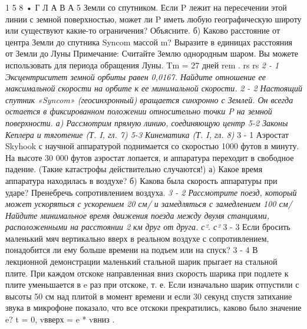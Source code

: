 \documentclass[10pt,oneside]{article}
\begin{document}
1 5 8 • Г Л А В А  5 Земли со спутником. Если P лежит на пересечении этой линии с земной поверхностью, может ли P иметь любую географическую широту или существуют какие-то ограничения? Объясните. б) Каково расстояние от центра Земли до спутника Syncom массой m? Выразите в единицах расстояния от Земли до Луны Примечание: Считайте Землю однородным шаром. Вы можете использовать для периода обращения Луны. Tm = 27 дней rem . rs rs \emph{ 2 - 1 Эксцентриситет земной орбиты равен 0,0167. Найдите отношение ее максимальной скорости на орбите к ее минимальной скорости. } \emph{ 2 - 2 Настоящий спутник «Syncom» (геосинхронный) вращается синхронно с Землей. Он всегда остается в фиксированном положении относительно точки P на земной поверхности. а) Рассмотрим прямую линию, соединяющую центр 5-2 Законы Кеплера и тяготение (Т. I, гл. 7) 5-3 Кинематика (Т. I, гл. 8) } 3 - 1 Аэростат Skyhook с научной аппаратурой поднимается со скоростью 1000 футов в минуту. На высоте 30 000 футов аэростат лопается, и аппаратура переходит в свободное падение. (Такие катастрофы действительно случаются!) а) Какое время аппаратура находилась в воздухе? б) Какова была скорость аппаратуры при ударе? Пренебречь сопротивлением воздуха. \emph{ 3 - 2 Рассмотрите поезд, который может ускоряться с ускорением 20 см/ и замедляться с замедлением 100 см/ Найдите минимальное время движения поезда между двумя станциями, расположенными на расстоянии 2 км друг от друга. с². с² } 3 - 3 Если бросить маленький мяч вертикально вверх в реальном воздухе с сопротивлением, понадобится ли ему больше времени на подъем или на спуск? \emph{ } 3 - 4 В лекционной демонстрации маленький стальной шарик прыгает на стальной плите. При каждом отскоке направленная вниз скорость шарика при подлете к плите уменьшается в e раз при отскоке, т. е. Если изначально шарик отпустили с высоты 50 см над плитой в момент времени и если 30 секунд спустя затихание звука в микрофоне показало, что все отскоки прекратились, каково было значение e? t = 0, vвверх = e * vвниз .\par
\end{document}
